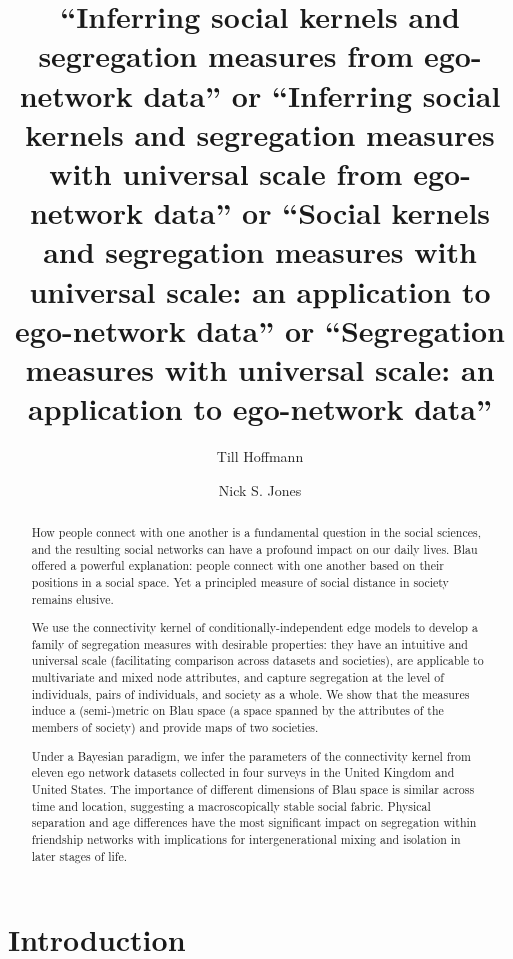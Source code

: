 \documentclass{scrartcl}
\title{``Inferring social kernels and segregation measures from ego-network data'' or ``Inferring social kernels and segregation measures with universal scale from ego-network data'' or ``Social kernels and segregation measures with universal scale: an application to ego-network data'' or ``Segregation measures with universal scale: an application to ego-network data''}
\author{Till Hoffmann}
\author{Nick S. Jones}
\affil{Department of Mathematics, Imperial College London}
\date{}
\begin{document}
\maketitle

\begin{abstract} %
    How people connect with one another is a fundamental question in the social sciences, and the resulting social networks can have a profound impact on our daily lives. Blau offered a powerful explanation: people connect with one another based on their positions in a social space. Yet a principled measure of social distance in society remains elusive.

    We use the connectivity kernel of conditionally-independent edge models to develop a family of segregation measures with desirable properties: they have an intuitive and universal scale (facilitating comparison across datasets and societies), are applicable to multivariate and mixed node attributes, and capture segregation at the level of individuals, pairs of individuals, and society as a whole. We show that the measures induce a (semi-)metric on Blau space (a space spanned by the attributes of the members of society) and provide maps of two societies.

    Under a Bayesian paradigm, we infer the parameters of the connectivity kernel from eleven ego network datasets collected in four surveys in the United Kingdom and United States. The importance of different dimensions of Blau space is similar across time and location, suggesting a macroscopically stable social fabric. Physical separation and age differences have the most significant impact on segregation within friendship networks with implications for intergenerational mixing and isolation in later stages of life.
\end{abstract}

\section{Introduction\label{sec:introduction}}
\end{document}
